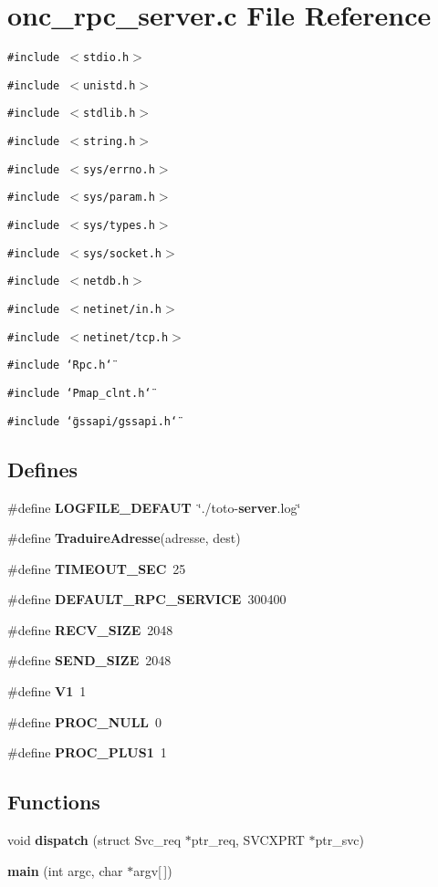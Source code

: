 \section{onc\_\-rpc\_\-server.c File Reference}
\label{onc__rpc__server_8c}
{\tt \#include $<$stdio.h$>$}\par
{\tt \#include $<$unistd.h$>$}\par
{\tt \#include $<$stdlib.h$>$}\par
{\tt \#include $<$string.h$>$}\par
{\tt \#include $<$sys/errno.h$>$}\par
{\tt \#include $<$sys/param.h$>$}\par
{\tt \#include $<$sys/types.h$>$}\par
{\tt \#include $<$sys/socket.h$>$}\par
{\tt \#include $<$netdb.h$>$}\par
{\tt \#include $<$netinet/in.h$>$}\par
{\tt \#include $<$netinet/tcp.h$>$}\par
{\tt \#include \char`\"{}Rpc.h\char`\"{}}\par
{\tt \#include \char`\"{}Pmap\_\-clnt.h\char`\"{}}\par
{\tt \#include \char`\"{}gssapi/gssapi.h\char`\"{}}\par
\subsection*{Defines}
\begin{CompactItemize}
\item 
\#define {\bf LOGFILE\_\-DEFAUT}\ \char`\"{}./toto-{\bf server}.log\char`\"{}
\item 
\#define {\bf Traduire\-Adresse}(adresse, dest)
\item 
\#define {\bf TIMEOUT\_\-SEC}\ 25
\item 
\#define {\bf DEFAULT\_\-RPC\_\-SERVICE}\ 300400
\item 
\#define {\bf RECV\_\-SIZE}\ 2048
\item 
\#define {\bf SEND\_\-SIZE}\ 2048
\item 
\#define {\bf V1}\ 1
\item 
\#define {\bf PROC\_\-NULL}\ 0
\item 
\#define {\bf PROC\_\-PLUS1}\ 1
\end{CompactItemize}
\subsection*{Functions}
\begin{CompactItemize}
\item 
void {\bf dispatch} (struct Svc\_\-req $\ast$ptr\_\-req, SVCXPRT $\ast$ptr\_\-svc)
\item 
{\bf main} (int argc, char $\ast$argv[$\,$])
\end{CompactItemize}
